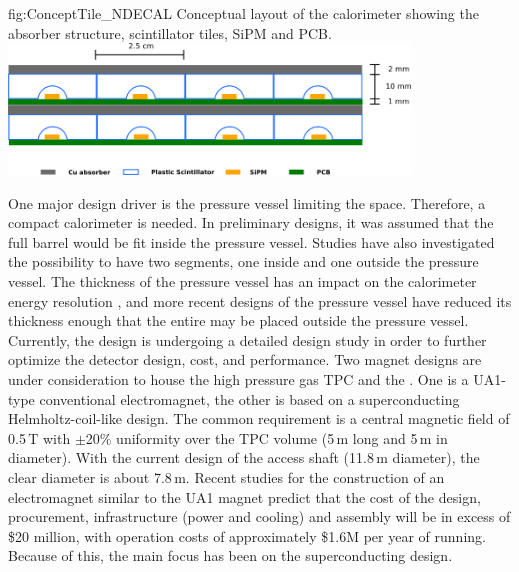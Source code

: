 \begin{dunefigure}{fig:ConceptTile_NDECAL}
{Conceptual layout of the calorimeter showing the absorber structure, scintillator tiles, SiPM and PCB.}
\includegraphics[width=0.8\textwidth]{graphics/TileConcept.png}
\end{dunefigure}

One major design driver is the pressure vessel limiting the space. Therefore, a compact calorimeter is needed. In preliminary designs, it was assumed that the full  barrel would be fit inside the pressure vessel. Studies have also investigated the possibility to have two segments, one inside and one outside the pressure vessel.  The thickness of the pressure vessel has an impact on the calorimeter energy resolution \cite{Emberger:2018pgr}, and more recent designs of the pressure vessel have reduced its thickness enough that the entire  may be placed outside the pressure vessel. Currently, the  design is undergoing a detailed design study in order to further optimize the detector design, cost, and performance.  
%
\label{sssec:nd-exsum-mpd-magnet}
%
Two magnet designs are under consideration to house the high pressure gas TPC and the . One is a UA1-type conventional electromagnet, the other is based on a superconducting Helmholtz-coil-like design. The common requirement is a central magnetic field of 0.5\,T with $\pm$20\% uniformity over the TPC volume (5\,m long and 5\,m in diameter). With the current design of the access shaft (11.8\,m diameter), the clear diameter is about 7.8\,m. Recent studies for the construction of an electromagnet similar to the UA1 magnet predict that the cost of the design, procurement, infrastructure (power and cooling) and assembly will be in excess of \$20 million, with operation costs of approximately \$1.6M per year of running.  Because of this, the main focus has been on the superconducting design.
%

